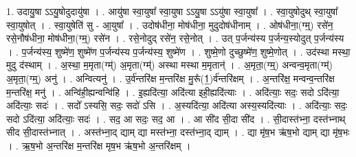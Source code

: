 \documentclass[17pt]{extarticle}
\begin{document}
1. उदायु॒षा ऽऽयु॒षोदुदायु॑षा । . आयु॑षा स्वा॒युषा᳚ स्वा॒युषा ऽऽयु॒षा ऽऽयु॑षा स्वा॒युषा᳚ । . स्वा॒युषोदुथ् स्वा॒युषा᳚ स्वा॒युषोत् । . स्वा॒युषेति॑ सु - आ॒युषा᳚ । . उदोष॑धीना॒ मोष॑धीना॒ मुदुदोष॑धीनाम् । . ओष॑धीना॒(ग्म्॒) रसे॑न॒ रसे॒नौष॑धीना॒ मोष॑धीना॒(ग्म्॒) रसे॑न । . रसे॒नोदुद् रसे॑न॒ रसे॒नोत् । . उत् प॒र्जन्य॑स्य प॒र्जन्य॒स्योदुत् प॒र्जन्य॑स्य । . प॒र्जन्य॑स्य॒ शुष्मे॑ण॒ शुष्मे॑ण प॒र्जन्य॑स्य प॒र्जन्य॑स्य॒ शुष्मे॑ण । . शुष्मे॒णो दुच्छुष्मे॑ण॒ शुष्मे॒णोत् । . उद॑स्था मस्था॒ मुदु द॑स्थाम् । . अ॒स्था॒ म॒मृता(ग्म्॑) अ॒मृता(ग्म्॑) अस्था मस्था म॒मृतान्॑ । . अ॒मृता॒(ग्म्॒) अन्वन्व॒मृता(ग्म्॑) अ॒मृता॒(ग्म्॒) अनु॑ । . अन्वित्यनु॑ । . उ॒र्व॑न्तरि॑क्ष म॒न्तरि॑क्ष मु॒रू᳚(1॒)र्व॑न्तरि॑क्षम् । . अ॒न्तरि॑क्ष॒ मन्वन्व॒न्तरि॑क्ष म॒न्तरि॑क्ष॒ मनु॑ । . अन्वि॑ही॒ह्यन्वन्वि॑हि । . इ॒ह्यदि॑त्या॒ अदि॑त्या इही॒ह्यदि॑त्याः । . अदि॑त्याः॒ सदः॒ सदो ऽदि॑त्या॒ अदि॑त्याः॒ सदः॑ । . सदो᳚ ऽस्यसि॒ सदः॒ सदो॑ ऽसि । . अ॒स्यदि॑त्या॒ अदि॑त्या अस्य॒स्यदि॑त्याः । . अदि॑त्याः॒ सदः॒ सदो ऽदि॑त्या॒ अदि॑त्याः॒ सदः॑ । . सद॒ आ सदः॒ सद॒ आ । . आ सी॑द सी॒दा सी॑द । . सी॒दास्त॑भ्ना॒ दस्त॑भ्नाथ् सीद सी॒दास्त॑भ्नात् । . अस्त॑भ्ना॒द् द्याम् द्या मस्त॑भ्ना॒ दस्त॑भ्ना॒द् द्याम् । . द्या मृ॑ष॒भ ऋ॑ष॒भो द्याम् द्या मृ॑ष॒भः । . ऋ॒ष॒भो अ॒न्तरि॑क्ष म॒न्तरि॑क्ष मृष॒भ ऋ॑ष॒भो अ॒न्तरि॑क्षम् । \newline
\end{document}
